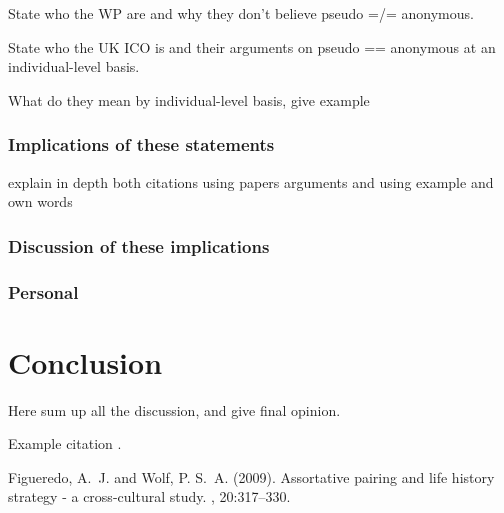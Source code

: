 \documentclass[12pt]{article} %
\begin{document}
State who the WP are and why they don't believe pseudo =/= anonymous.

State who the UK ICO is and their arguments on pseudo == anonymous at an individual-level basis.

What do they mean by individual-level basis, give example

\subsubsection{Implications of these statements}
explain in depth both citations using papers arguments and using example and own words

\subsubsection{Discussion of these implications}

\subsubsection{Personal}




\section{Conclusion} %

Here sum up all the discussion, and give final opinion.

Example citation \cite{Figueredo:2009dg}.


\begin{thebibliography}{99} %

Figueredo, A.~J. and Wolf, P. S.~A. (2009).
\newblock Assortative pairing and life history strategy - a cross-cultural
  study.
, 20:317--330.
 
\end{thebibliography}

\end{document}
